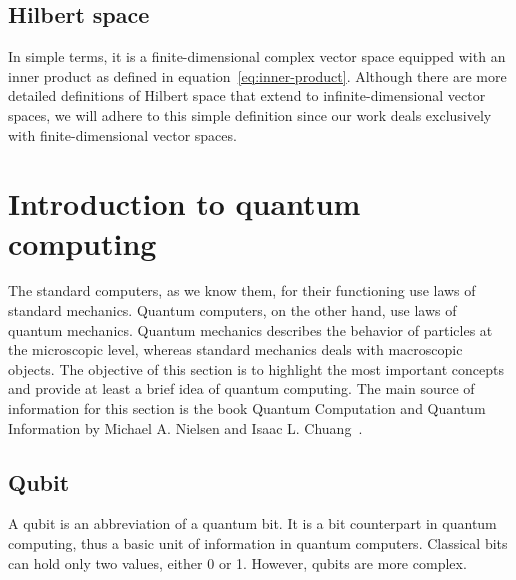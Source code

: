 \tocless\subsection{Hilbert space}\noindent
In simple terms, it is a finite-dimensional complex vector space equipped with an inner product as defined in equation~\ref{eq:inner-product}. Although there are more detailed definitions of Hilbert space that extend to infinite-dimensional vector spaces, we will adhere to this simple definition since our work deals exclusively with finite-dimensional vector spaces.

\section{Introduction to quantum computing}
The standard computers, as we know them, for their functioning use laws of standard mechanics. Quantum computers, on the other hand, use laws of quantum mechanics. Quantum mechanics describes the behavior of particles at the microscopic level, whereas standard mechanics deals with macroscopic objects. The objective of this section is to highlight the most important concepts and provide at least a brief idea of quantum computing. The main source of information for this section is the book Quantum Computation and Quantum Information by Michael A. Nielsen and Isaac L. Chuang~\cite{qc}.

\tocless\subsection{Qubit}\noindent
A qubit is an abbreviation of a quantum bit. It is a bit counterpart in quantum computing, thus a basic unit of information in quantum computers. Classical bits can hold only two values, either 0 or 1. However, qubits are more complex.

